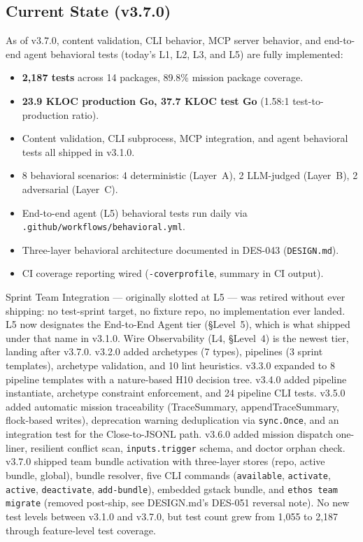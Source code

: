\documentclass[a4paper,10pt]{article}
\newcommand{\fpath}[1]{\texttt{#1}}
\begin{document}
\subsection{Current State (v3.7.0)}

As of v3.7.0, content validation, CLI behavior, MCP server behavior,
and end-to-end agent behavioral tests (today's L1, L2, L3, and L5)
are fully implemented:

\begin{itemize}
  \item \textbf{2,187 tests} across 14 packages, 89.8\% mission
    package coverage.
  \item \textbf{23.9 KLOC production Go, 37.7 KLOC test Go} (1.58:1
    test-to-production ratio).
  \item Content validation, CLI subprocess, MCP integration, and
    agent behavioral tests all shipped in v3.1.0.
  \item 8 behavioral scenarios: 4 deterministic (Layer~A), 2
    LLM-judged (Layer~B), 2 adversarial (Layer~C).
  \item End-to-end agent (L5) behavioral tests run daily via
    \fpath{.github/workflows/behavioral.yml}.
  \item Three-layer behavioral architecture documented in DES-043
    (\texttt{DESIGN.md}).
  \item CI coverage reporting wired (\texttt{-coverprofile}, summary
    in CI output).
\end{itemize}

Sprint Team Integration --- originally slotted at L5 --- was retired
without ever shipping: no test-sprint target, no fixture repo, no
implementation ever landed.  L5 now designates the End-to-End Agent
tier (\S Level~5), which is what shipped under that name in v3.1.0.
Wire Observability (L4, \S Level~4) is the newest tier, landing after
v3.7.0.  v3.2.0 added archetypes
(7 types), pipelines (3 sprint templates), archetype validation, and
10 lint heuristics.  v3.3.0 expanded to 8 pipeline templates with a
nature-based H10 decision tree.  v3.4.0 added pipeline instantiate,
archetype constraint enforcement, and 24 pipeline CLI tests.  v3.5.0
added automatic mission traceability (TraceSummary,
appendTraceSummary, flock-based writes), deprecation warning
deduplication via \texttt{sync.Once}, and an integration test for the
Close-to-JSONL path.  v3.6.0 added mission dispatch one-liner,
resilient conflict scan, \texttt{inputs.trigger} schema, and doctor
orphan check.  v3.7.0 shipped team bundle activation with three-layer
stores (repo, active bundle, global), bundle resolver, five CLI
commands (\texttt{available}, \texttt{activate}, \texttt{active},
\texttt{deactivate}, \texttt{add-bundle}), embedded gstack bundle,
and \texttt{ethos team migrate} (removed post-ship, see DESIGN.md's
DES-051 reversal note).  No new test levels between v3.1.0 and
v3.7.0, but test count grew from 1,055 to 2,187 through feature-level
test coverage.
\end{document}

